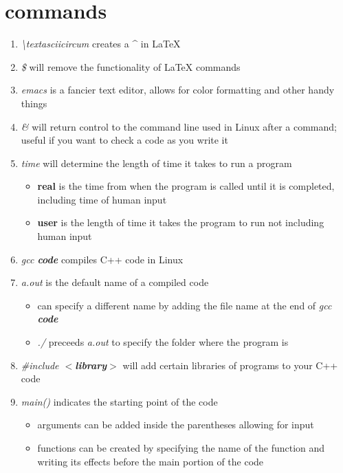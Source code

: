 \documentclass{article}
\begin{document}
\section{commands}
\begin{enumerate}
    \item \textit{\textbackslash textasciicircum} creates a \textbf{\textasciicircum} in LaTeX
    \item \textit{\$} will remove the functionality of LaTeX commands
    \item \textit{emacs} is a fancier text editor, allows for color formatting and other handy things
    \item \textit{\&} will return control to the command line used in Linux after a command; useful if you want to check a code as you write it
    \item \textit{time} will determine the length of time it takes to run a program
    \begin{itemize}
        \item \textbf{real} is the time from when the program is called until it is completed, including time of human input
        \item \textbf{user} is the length of time it takes the program to run not including human input
    \end{itemize}
    \item \textit{gcc \textbf{code}} compiles C++ code in Linux
    \item \textit{a.out} is the default name of a compiled code
    \begin{itemize}
        \item can specify a different name by adding the file name at the end of \textit{gcc \textbf{code}}
        \item \textit{./} preceeds \textit{a.out} to specify the folder where the program is
    \end{itemize}
    \item \textit{#include $<$\textbf{library}$>$} will add certain libraries of programs to your C++ code
    \item \textit{main()} indicates the starting point of the code
    \begin{itemize}
        \item arguments can be added inside the parentheses allowing for input
        \item functions can be created by specifying the name of the function and writing its effects before the main portion of the code
    \end{itemize}

\end{enumerate}
\end{document}
